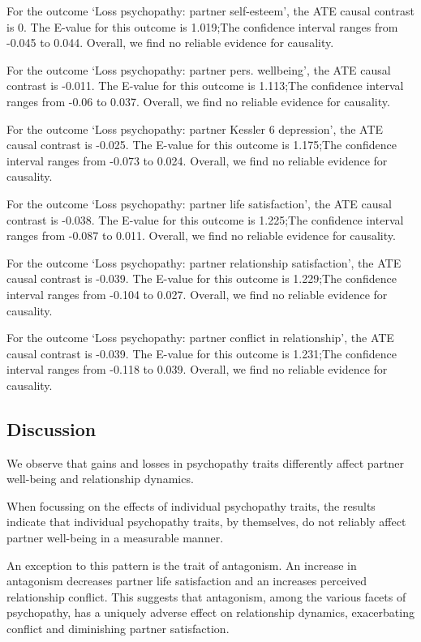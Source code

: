 \documentclass[
  singlecolumn]{article}
\begin{document}
For the outcome `Loss psychopathy: partner self-esteem', the ATE causal
contrast is 0. The E-value for this outcome is 1.019;The confidence
interval ranges from -0.045 to 0.044. Overall, we find no reliable
evidence for causality.

For the outcome `Loss psychopathy: partner pers. wellbeing', the ATE
causal contrast is -0.011. The E-value for this outcome is 1.113;The
confidence interval ranges from -0.06 to 0.037. Overall, we find no
reliable evidence for causality.

For the outcome `Loss psychopathy: partner Kessler 6 depression', the
ATE causal contrast is -0.025. The E-value for this outcome is 1.175;The
confidence interval ranges from -0.073 to 0.024. Overall, we find no
reliable evidence for causality.

For the outcome `Loss psychopathy: partner life satisfaction', the ATE
causal contrast is -0.038. The E-value for this outcome is 1.225;The
confidence interval ranges from -0.087 to 0.011. Overall, we find no
reliable evidence for causality.

For the outcome `Loss psychopathy: partner relationship satisfaction',
the ATE causal contrast is -0.039. The E-value for this outcome is
1.229;The confidence interval ranges from -0.104 to 0.027. Overall, we
find no reliable evidence for causality.

For the outcome `Loss psychopathy: partner conflict in relationship',
the ATE causal contrast is -0.039. The E-value for this outcome is
1.231;The confidence interval ranges from -0.118 to 0.039. Overall, we
find no reliable evidence for causality.

\subsection{Discussion}\label{discussion}

We observe that gains and losses in psychopathy traits differently
affect partner well-being and relationship dynamics.

When focussing on the effects of individual psychopathy traits, the
results indicate that individual psychopathy traits, by themselves, do
not reliably affect partner well-being in a measurable manner.

An exception to this pattern is the trait of antagonism. An increase in
antagonism decreases partner life satisfaction and an increases
perceived relationship conflict. This suggests that antagonism, among
the various facets of psychopathy, has a uniquely adverse effect on
relationship dynamics, exacerbating conflict and diminishing partner
satisfaction.
\end{document}
